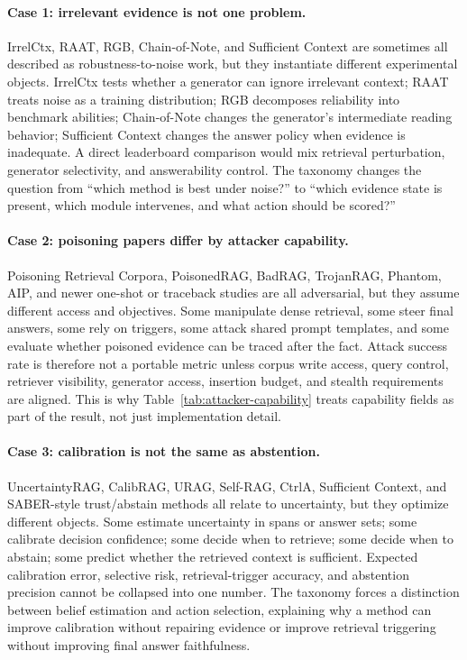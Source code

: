 \documentclass[11pt]{article}
\begin{document}
\paragraph{Case 1: irrelevant evidence is not one problem.}
IrrelCtx, RAAT, RGB, Chain-of-Note, and Sufficient Context are sometimes all described as robustness-to-noise work, but they instantiate different experimental objects. IrrelCtx tests whether a generator can ignore irrelevant context; RAAT treats noise as a training distribution; RGB decomposes reliability into benchmark abilities; Chain-of-Note changes the generator's intermediate reading behavior; Sufficient Context changes the answer policy when evidence is inadequate. A direct leaderboard comparison would mix retrieval perturbation, generator selectivity, and answerability control. The taxonomy changes the question from ``which method is best under noise?'' to ``which evidence state is present, which module intervenes, and what action should be scored?''

\paragraph{Case 2: poisoning papers differ by attacker capability.}
Poisoning Retrieval Corpora, PoisonedRAG, BadRAG, TrojanRAG, Phantom, AIP, and newer one-shot or traceback studies are all adversarial, but they assume different access and objectives. Some manipulate dense retrieval, some steer final answers, some rely on triggers, some attack shared prompt templates, and some evaluate whether poisoned evidence can be traced after the fact. Attack success rate is therefore not a portable metric unless corpus write access, query control, retriever visibility, generator access, insertion budget, and stealth requirements are aligned. This is why Table~\ref{tab:attacker-capability} treats capability fields as part of the result, not just implementation detail.

\paragraph{Case 3: calibration is not the same as abstention.}
UncertaintyRAG, CalibRAG, URAG, Self-RAG, CtrlA, Sufficient Context, and SABER-style trust/abstain methods all relate to uncertainty, but they optimize different objects. Some estimate uncertainty in spans or answer sets; some calibrate decision confidence; some decide when to retrieve; some decide when to abstain; some predict whether the retrieved context is sufficient. Expected calibration error, selective risk, retrieval-trigger accuracy, and abstention precision cannot be collapsed into one number. The taxonomy forces a distinction between belief estimation and action selection, explaining why a method can improve calibration without repairing evidence or improve retrieval triggering without improving final answer faithfulness.
\end{document}
